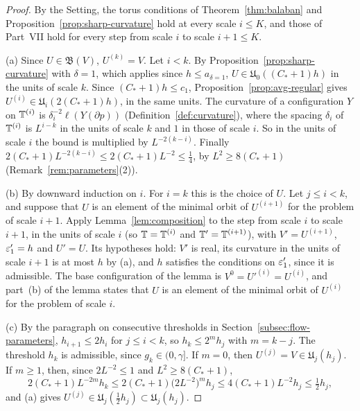 \begin{proof}
By the Setting, the torus conditions of Theorem~\ref{thm:balaban} and Proposition~\ref{prop:sharp-curvature} hold at every scale $i\le K$, and those of Part~VII hold for every step from scale $i$ to scale $i+1\le K$.

(a) Since $U\in\mathfrak B(V)$, $U^{(k)}=V$. Let $i<k$. By Proposition~\ref{prop:sharp-curvature} with $\delta=1$, which applies since $h\le a_{\delta=1}$, $U\in\mathfrak U_0((C_*+1)h)$ in the units of scale $k$. Since $(C_*+1)h\le c_1$, Proposition~\ref{prop:avg-regular} gives $U^{(i)}\in\mathfrak U_i(2(C_*+1)h)$, in the same units. The curvature of a configuration $Y$ on $\mathbb T^{(i)}$ is $\delta_i^{-2}\ell(Y(\partial p))$ (Definition~\ref{def:curvature}), where the spacing $\delta_i$ of $\mathbb T^{(i)}$ is $L^{i-k}$ in the units of scale $k$ and $1$ in those of scale $i$. So in the units of scale $i$ the bound is multiplied by $L^{-2(k-i)}$. Finally $2(C_*+1)L^{-2(k-i)}\le2(C_*+1)L^{-2}\le\frac14$, by $L^2\ge8(C_*+1)$ (Remark~\ref{rem:parameters}(2)).

(b) By downward induction on $i$. For $i=k$ this is the choice of $U$. Let $j\le i<k$, and suppose that $U$ is an element of the minimal orbit of $U^{(i+1)}$ for the problem of scale $i+1$. Apply Lemma~\ref{lem:composition} to the step from scale $i$ to scale $i+1$, in the units of scale $i$ (so $\mathbb T=\mathbb T^{(i)}$ and $\mathbb T'=\mathbb T^{(i+1)}$), with $V'=U^{(i+1)}$, $\varepsilon'_1=h$ and $U'=U$. Its hypotheses hold: $V'$ is real, its curvature in the units of scale $i+1$ is at most $h$ by (a), and $h$ satisfies the conditions on $\varepsilon'_1$, since it is admissible. The base configuration of the lemma is $V^0=U'^{(i)}=U^{(i)}$, and part~(b) of the lemma states that $U$ is an element of the minimal orbit of $U^{(i)}$ for the problem of scale $i$.

(c) By the paragraph on consecutive thresholds in Section~\ref{subsec:flow-parameters}, $h_{i+1}\le2h_i$ for $j\le i<k$, so $h_k\le2^mh_j$ with $m=k-j$. The threshold $h_k$ is admissible, since $g_k\in(0,\gamma]$. If $m=0$, then $U^{(j)}=V\in\mathfrak U_j(h_j)$. If $m\ge1$, then, since $2L^{-2}\le1$ and $L^2\ge8(C_*+1)$,
\[
2(C_*+1)L^{-2m}h_k\le2(C_*+1)\big(2L^{-2}\big)^mh_j\le4(C_*+1)L^{-2}h_j\le\tfrac12h_j ,
\]
and (a) gives $U^{(j)}\in\mathfrak U_j(\frac12h_j)\subset\mathfrak U_j(h_j)$.


\end{proof}
